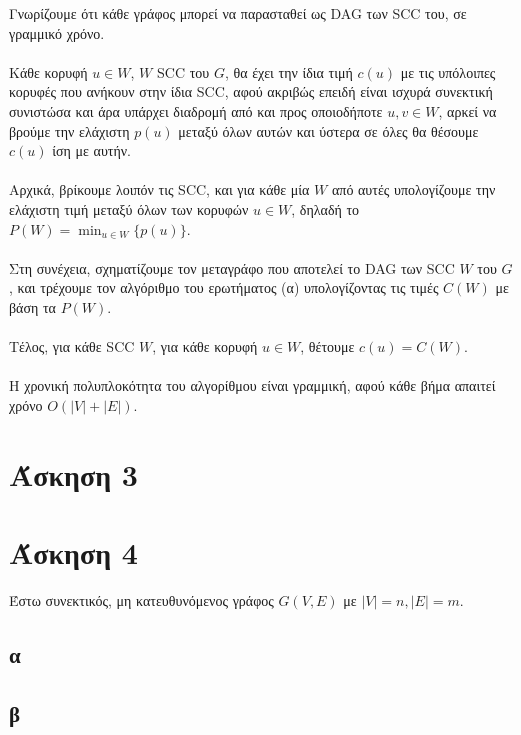 \documentclass[12pt,a4paper]{article}
\begin{document}
  Γνωρίζουμε ότι κάθε γράφος μπορεί να παρασταθεί ως {\latintext DAG} των 
  {\latintext SCC} του, σε γραμμικό χρόνο.
  \\
  \\
  Κάθε κορυφή \( u \in W \), \( W \) {\latintext SCC} του \( G \),
  θα έχει την ίδια τιμή \( c(u) \) με τις υπόλοιπες κορυφές που
  ανήκουν στην ίδια {\latintext SCC}, αφού ακριβώς επειδή είναι ισχυρά συνεκτική
  συνιστώσα και άρα υπάρχει διαδρομή από και προς οποιοδήποτε
  \( u, v \in W \), αρκεί να
  βρούμε την ελάχιστη \( p(u) \) μεταξύ όλων αυτών και ύστερα σε όλες θα θέσουμε
  \( c(u) \) ίση με αυτήν.
  \\
  \\
  Αρχικά, βρίκουμε λοιπόν τις {\latintext SCC}, και για κάθε μία \( W \) από
  αυτές υπολογίζουμε την ελάχιστη τιμή μεταξύ όλων των κορυφών \( u \in W \),
  δηλαδή το \( P(W) = \min_{u \in W}\{ p(u) \}\).
  \\
  \\
  Στη συνέχεια, σχηματίζουμε τον μεταγράφο που αποτελεί το {\latintext DAG} των 
  {\latintext SCC \( W \)} του \( G \), και τρέχουμε τον αλγόριθμο του
  ερωτήματος (α) υπολογίζοντας τις τιμές \( C(W) \) με βάση τα \( P(W) \).
  \\
  \\
  Tέλος, για κάθε {\latintext SCC \(W\)}, για κάθε κορυφή \(u \in W \), θέτουμε
  \( c(u) = C(W) \).
  \\
  \\
  Η χρονική πολυπλοκότητα του αλγορίθμου είναι γραμμική, αφού κάθε βήμα απαιτεί
  χρόνο \( Ο(|V| + |E|) \).

  \section{Άσκηση 3}
  
  \section{Άσκηση 4}

  Έστω συνεκτικός, μη κατευθυνόμενος γράφος \( G(V, E) \) με \( |V| = n,
  |E| = m \).

  \subsection{α}
  
  \subsection{β}
\end{document}

